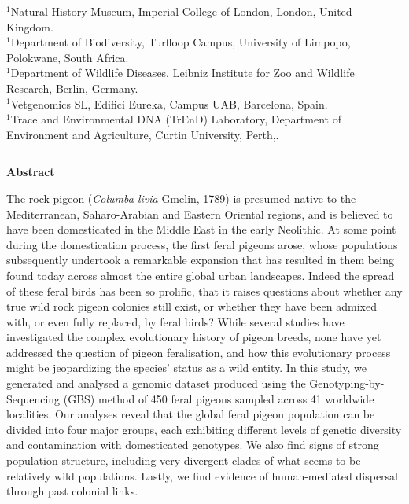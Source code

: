 \documentclass[a4paper]{article}
\begin{document}
\begin{center}
\begin{flushleft}
$^1$Natural History Museum, Imperial College of London, London, United Kingdom. \\
$^1$Department of Biodiversity, Turfloop Campus, University of Limpopo, Polokwane, South Africa. \\
$^1$Department of Wildlife Diseases, Leibniz Institute for Zoo and Wildlife Research, Berlin, Germany. \\
$^1$Vetgenomics SL, Edifici Eureka, Campus UAB, Barcelona, Spain. \\
$^1$Trace and Environmental DNA (TrEnD) Laboratory, Department of Environment and Agriculture, Curtin University, Perth,.
\end{flushleft}
\end{center}

\begin{lstlisting}
\end{lstlisting}

\begin{center}
\noindent \bfseries {} Abstract \\
\end{center}

 \small
The rock pigeon (\textit{Columba livia} Gmelin, 1789) is presumed native to the Mediterranean, Saharo-Arabian and Eastern Oriental regions, and is believed to have been domesticated in the Middle East in the early Neolithic. At some point during the domestication process, the first feral pigeons arose, whose populations subsequently undertook a remarkable expansion that has resulted in them being found today across almost the entire global urban landscapes. Indeed the spread of these feral birds has been so prolific, that it raises questions about whether any true wild rock pigeon colonies still exist, or whether they have been admixed with, or even fully replaced, by feral birds? While several studies have investigated the complex evolutionary history of pigeon breeds, none have yet addressed the question of pigeon feralisation, and how this evolutionary process might be jeopardizing the species’ status as a wild entity. In this study, we generated and analysed a genomic dataset produced using the Genotyping-by-Sequencing (GBS) method of 450 feral pigeons sampled across 41 worldwide localities. Our analyses reveal that the global feral pigeon population can be divided into four major groups, each exhibiting different levels of genetic diversity and contamination with domesticated genotypes. We also find signs of strong population structure, including very divergent clades of what seems to be relatively wild populations. Lastly, we find evidence of human-mediated dispersal through past colonial links.\
\end{document}
